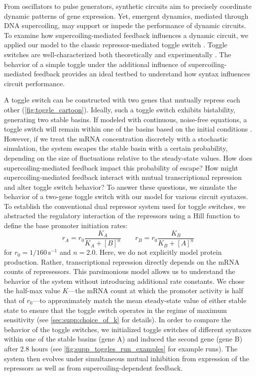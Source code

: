\documentclass[11pt]{article}
\begin{document}
From oscillators to pulse generators, synthetic circuits aim to precisely coordinate dynamic patterns of gene expression. Yet, emergent dynamics, mediated through DNA supercoiling, may support or impede the performance of dynamic circuits. To examine how supercoiling-mediated feedback influences a dynamic circuit, we applied our model to the classic repressor-mediated toggle switch \parencite{gardnerConstructionGeneticToggle2000}. Toggle switches are well-characterized both theoretically \parencite{gardnerConstructionGeneticToggle2000} and experimentally \parencite{gardnerConstructionGeneticToggle2000,yeungBiophysicalConstraintsArising2017,zhuSyntheticMultistabilityMammalian2021}. The behavior of a simple toggle under the additional influence of supercoiling-mediated feedback provides an ideal testbed to understand how syntax influences circuit performance.

A toggle switch can be constructed with two genes that mutually repress each other (\cref{fig:toggle_cartoon}). Ideally, such a toggle switch exhibits bistability, generating two stable basins. If modeled with continuous, noise-free equations, a toggle switch will remain within one of the basins based on the initial conditions \parencite{gardnerConstructionGeneticToggle2000}. However, if we treat the mRNA concentration discretely with a stochastic simulation, the system escapes the stable basin with a certain probability, depending on the size of fluctuations relative to the steady-state values. How does supercoiling-mediated feedback impact this probability of escape? How might supercoiling-mediated feedback interact with mutual transcriptional repression and alter toggle switch behavior?
To answer these questions, we simulate the behavior of a two-gene toggle switch with our model for various circuit syntaxes. To establish the conventional dual repressor system used for toggle switches, we abstracted the regulatory interaction of the repressors using a Hill function to define the base promoter initiation rates:
\begin{equation}
    r_A = r_0 \frac{K_A}{K_A + [B]^n} \qquad r_B = r_0 \frac{K_B}{K_B + [A]^n}
\end{equation}
for \(r_0 = 1/160 \,\text{s}^{-1}\) and \(n = 2.0\). Here, we do not explicitly model protein production. Rather, transcriptional repression directly depends on the mRNA counts of represessors. This parsimonious model allows us to understand the behavior of the system without introducing additional rate constants. We chose the half-max value \(K\)---the mRNA count at which the promoter activity is half that of \(r_0\)---to approximately match the mean steady-state value of either stable state to ensure that the toggle switch operates in the regime of maximum sensitivity (see \cref{sec:supp:choice_of_k} for details). In order to compare the behavior of the toggle switches, we initialized toggle switches of different syntaxes within one of the stable basins (gene A) and induced the second gene (gene B) after 2.8 hours (see \cref{fig:supp_toggles_run_examples} for example runs). The system then evolves under simultaneous mutual inhibition from expression of the repressors as well as from supercoiling-dependent feedback.
\end{document}
